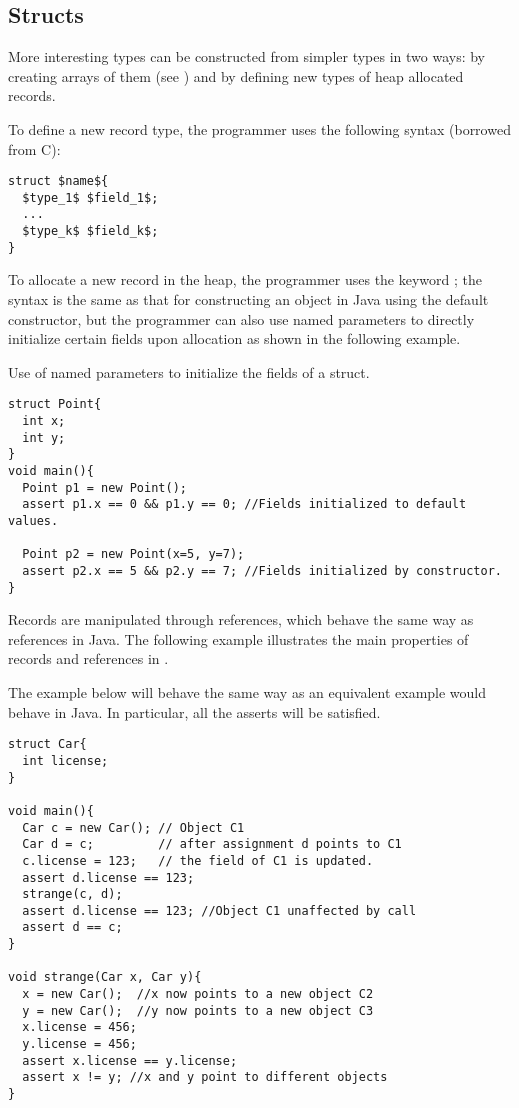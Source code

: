 \subsection{Structs}
More interesting types can be constructed from simpler types in two ways: by creating arrays of them (see ) and by defining new types of heap allocated records. 

To define a new record type, the programmer uses the following syntax (borrowed from C):
\begin{lstlisting}
struct $name${
  $type_1$ $field_1$;
  ...
  $type_k$ $field_k$;
}
\end{lstlisting}

To allocate a new record in the heap, the programmer uses the keyword ; the syntax is the same as that for constructing an object in Java using the default constructor, but the programmer can also use named parameters to directly initialize certain fields upon allocation as shown in the following example.

\begin{Example}
Use of named parameters to initialize the fields of a struct. 	
\begin{lstlisting}
struct Point{
  int x;
  int y;
}
void main(){
  Point p1 = new Point();
  assert p1.x == 0 && p1.y == 0; //Fields initialized to default values.

  Point p2 = new Point(x=5, y=7);
  assert p2.x == 5 && p2.y == 7; //Fields initialized by constructor.
}
\end{lstlisting}
\end{Example}

Records are manipulated through references, which behave the same way as references in Java. The following example illustrates the main properties of records and references in \Sk{}.

\begin{Example}
The example below will behave the same way as an equivalent example would behave in Java. In particular, all the asserts will be satisfied.
\begin{lstlisting}
struct Car{
  int license;
}

void main(){
  Car c = new Car(); // Object C1
  Car d = c;         // after assignment d points to C1
  c.license = 123;   // the field of C1 is updated.
  assert d.license == 123;
  strange(c, d);
  assert d.license == 123; //Object C1 unaffected by call
  assert d == c;
}

void strange(Car x, Car y){
  x = new Car();  //x now points to a new object C2
  y = new Car();  //y now points to a new object C3
  x.license = 456;
  y.license = 456;
  assert x.license == y.license;
  assert x != y; //x and y point to different objects
}
\end{lstlisting}

\end{Example}

